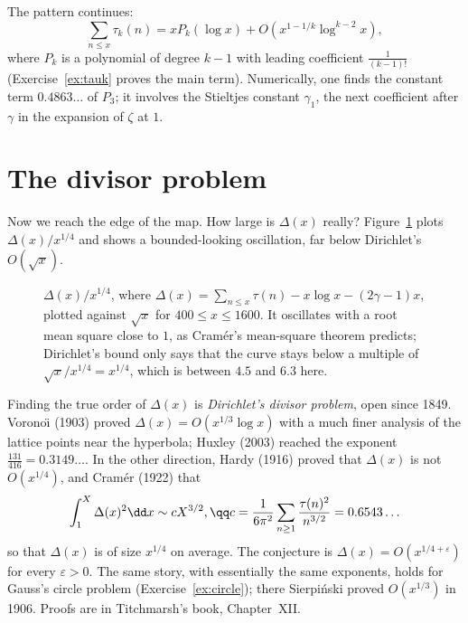 The pattern continues:
\[
\sum_{n\le x}\tau_k(n)=xP_k(\log x)+O(x^{1-1/k}\log^{k-2}x),
\]
where $P_k$ is a polynomial of degree $k-1$ with leading
coefficient $\frac1{(k-1)!}$ (Exercise~\ref{ex:tauk} proves the main term). Numerically, one finds the constant term $0.4863\ldots$ of
$P_3$; it involves the Stieltjes constant $\gamma_1$, the next coefficient after $\gamma$ in the expansion of $\zeta$ at $1$.

\section{The divisor problem}

Now we reach the edge of the map. How large is $\Delta(x)$ really? Figure~\ref{fig:divisorerr} plots $\Delta(x)/x^{1/4}$ and shows a bounded-looking oscillation, far below Dirichlet's
$O(\sqrt x)$.

\begin{figure}[ht]
\centering
{}
\caption{$\Delta(x)/x^{1/4}$, where $\Delta(x)=\sum_{n\le x}\tau(n)-x\log x-(2\gamma-1)x$, plotted against $\sqrt x$ for $400\le x\le1600$. It oscillates
with a root mean square close to $1$, as Cram\'er's mean-square theorem predicts; Dirichlet's bound only says that the curve stays below a multiple of
$\sqrt x/x^{1/4}=x^{1/4}$, which is between $4.5$ and $6.3$ here.}
\label{fig:divisorerr}
\end{figure}

\begin{remark}
Finding the true order of $\Delta(x)$ is \emph{Dirichlet's divisor problem}, open since 1849. Vorono\"\i{} (1903) proved $\Delta(x)=O(x^{1/3}\log x)$
with a much finer analysis of the lattice points near the hyperbola; Huxley (2003) reached the exponent $\frac{131}{416}=0.3149\ldots$. In
the other direction, Hardy (1916) proved that $\Delta(x)$ is not $O(x^{1/4})$, and Cram\'er (1922) that
\[
\begin{gathered}\int_1^X\Delta(x)^2\dd x\sim cX^{3/2},\qq c=\frac1{6\pi^2}\sum_{n\ge1}\frac{\tau(n)^2}{n^{3/2}}=0.6543\ldots\end{gathered}
\]
so that $\Delta(x)$ is of size $x^{1/4}$ on average. The conjecture is $\Delta(x)=O(x^{1/4+\varepsilon})$ for every $\varepsilon>0$. The same story, with essentially the
same exponents, holds for Gauss's circle problem (Exercise~\ref{ex:circle}); there Sierpi\'nski proved $O(x^{1/3})$ in 1906. Proofs are in Titchmarsh's book, Chapter~XII.
\end{remark}

